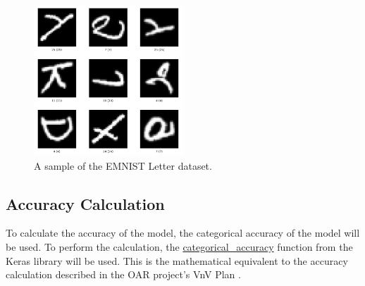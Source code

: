 \documentclass[12pt, titlepage]{article}
\begin{document}
\begin{figure}[H]
\centering
\includegraphics[width=0.5\textwidth]{emnist_letters.png}
\caption{A sample of the EMNIST Letter dataset.}
\label{FigUH}
\end{figure}

\subsection{Accuracy Calculation}
\label{sec:AccuracyCalculation}
To calculate the accuracy of the model, the categorical accuracy of the
model will be used. To perform the calculation, the \href{https://github.com/keras-team/keras/blob/c2e36f369b411ad1d0a40ac096fe35f73b9dffd3/keras/metrics.py}{categorical\_accuracy} function
from the Keras library will be used. This is the mathematical equivalent to the
accuracy calculation described in the OAR project's VnV Plan \citep{OARVnVPlan}.




\end{document}
